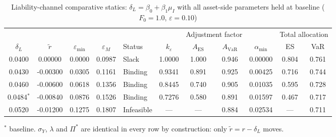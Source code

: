 \begin{table}[htbp]
\centering
\caption{Liability-channel comparative statics: $\delta_L = \beta_0 + \beta_1\mu_I$
with all asset-side parameters held at baseline ($F_0 = 1.0$, $\varepsilon = 0.10$)}
\label{tab:deltaL}
\begin{tabular}{cc cc l c cc c cc}
\toprule
 & & & & & & \multicolumn{2}{c}{Adjustment factor} & & \multicolumn{2}{c}{Total allocation} \\
\cmidrule(lr){7-8} \cmidrule(lr){10-11}
$\delta_L$ & $\tilde r$ & $\varepsilon_{\min}$ & $\varepsilon_M$ & Status
 & $k_\varepsilon$ & $A_{\mathrm{ES}}$ & $A_{\mathrm{VaR}}$ & $\alpha_{\min}$
 & ES & VaR \\
\midrule
  0.0400 & 0.00000 & 0.0000 & 0.0987 & Slack & 1.0000 & 1.000 & 0.946 & 0.00000 & 0.804 & 0.761 \\
  0.0430 & -0.00300 & 0.0305 & 0.1161 & Binding & 0.9341 & 0.891 & 0.925 & 0.00425 & 0.716 & 0.744 \\
  0.0460 & -0.00600 & 0.0618 & 0.1356 & Binding & 0.8445 & 0.740 & 0.905 & 0.01035 & 0.595 & 0.728 \\
  0.0484$^{*}$ & -0.00840 & 0.0876 & 0.1526 & Binding & 0.7276 & 0.580 & 0.891 & 0.01597 & 0.467 & 0.717 \\
  0.0520 & -0.01200 & 0.1275 & 0.1807 & Infeasible & --- & --- & 0.884 & 0.02534 & --- & 0.711 \\
\bottomrule
\end{tabular}

\vspace{2pt}
{\footnotesize $^{*}$ baseline. $\sigma_Y$, $\lambda$ and $\Pi^{*}$ are
identical in every row by construction: only $\tilde r = r - \delta_L$ moves.}
\end{table}
